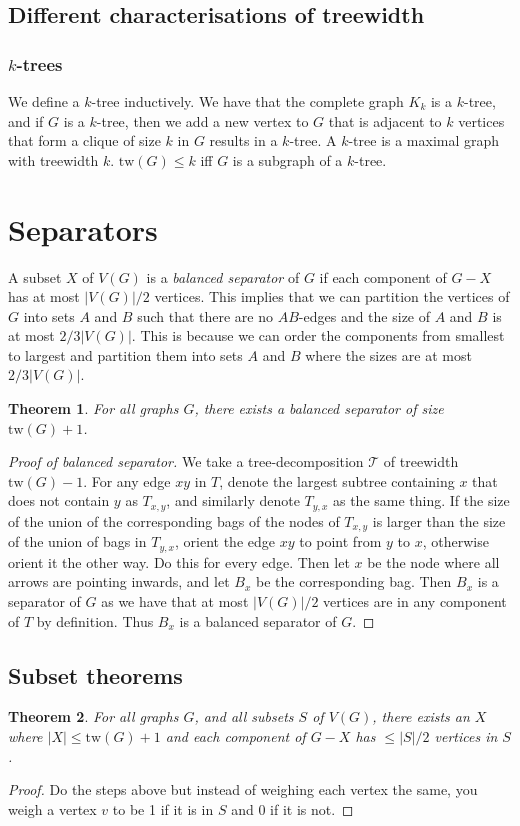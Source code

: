 \documentclass[]{article}
\newcommand{\tree}{\mathcal{T}}
\newcommand{\tw}{\text{tw}}
\newtheorem{theorem}{Theorem}
\theoremstyle{definition}
\numberwithin{theorem}{section}
\numberwithin{equation}{section}
\begin{document}
\subsection{Different characterisations of treewidth}
\subsubsection{$k$-trees}
We define a $k$-tree inductively. We have that the complete graph $K_k$ is a $k$-tree, and if $G$ is a $k$-tree, then we add a new vertex to $G$ that is adjacent to $k$ vertices that form a clique of size $k$ in $G$ results in a $k$-tree. 
A $k$-tree is a maximal graph with treewidth $k$. $\tw(G) \leq k$ iff $G$ is a subgraph of a $k$-tree. 

\section{Separators}
A subset $X$ of $V(G)$ is a \textit{balanced separator} of $G$ if each component of $G - X$ has at most $|V(G)|/2$ vertices. This implies that we can partition the vertices of $G$ into sets $A$ and $B$ such that there are no $AB$-edges and the size of $A$ and $B$ is at most $2/3 |V(G)|$. This is because we can order the components from smallest to largest and partition them into sets $A$ and $B$ where the sizes are at most $2/3 |V(G)|$.

\begin{theorem}
	For all graphs $G$, there exists a balanced separator of size $\tw(G) + 1$. 
\end{theorem}
\begin{proof}[Proof of balanced separator]
	We take a tree-decomposition $\tree$ of treewidth $\tw(G) - 1$. For any edge $xy$ in $T$, denote the largest subtree containing $x$ that does not contain $y$ as $T_{x,y}$, and similarly denote $T_{y, x}$ as the same thing. If the size of the union of the corresponding bags of the nodes of $T_{x,y}$ is larger than the size of the union of bags in $T_{y, x}$, orient the edge $xy$ to point from $y$ to $x$, otherwise orient it the other way. Do this for every edge. Then let $x$ be the node where all arrows are pointing inwards, and let $B_x$ be the corresponding bag. Then $B_x$ is a separator of $G$ as we have that at most $|V(G)|/2$ vertices are in any component of $T$ by definition. Thus $B_x$ is a balanced separator of $G$. 
\end{proof}

\subsection{Subset theorems}
\begin{theorem}
	For all graphs $G$, and all subsets $S$ of $V(G)$, there exists an $X$ where $|X| \leq \tw(G) + 1$ and each component of $G - X$ has $\leq |S|/2$ vertices in $S$. 
\end{theorem}
\begin{proof}
	Do the steps above but instead of weighing each vertex the same, you weigh a vertex $v$ to be 1 if it is in $S$ and 0 if it is not. 
\end{proof}
\end{document}
